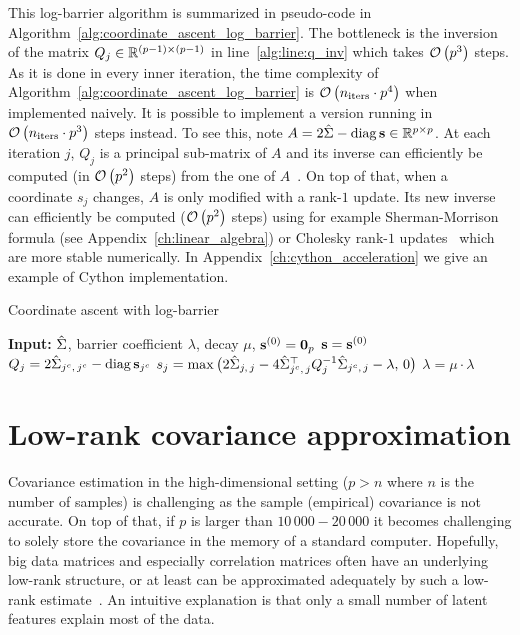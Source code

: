 \bigbreak
This log-barrier algorithm is summarized in pseudo-code in Algorithm~\ref{alg:coordinate_ascent_log_barrier}.
The bottleneck is the inversion of the matrix
$Q_j \in \mathbb{R}^{(p - 1) \times (p - 1)}$ in line~\ref{alg:line:q_inv} which takes $\mathcal{O}\left( p^3 \right)$ steps.
As it is done in every inner iteration, the time complexity of Algorithm~\ref{alg:coordinate_ascent_log_barrier} is
$\mathcal{O}\left( n_\text{iters} \cdot p^4 \right)$ when implemented naively.
It is possible to implement a version running in $\mathcal{O}\left( n_\text{iters} \cdot p^3 \right)$ steps instead.
To see this, note $A = 2\hat{\Sigma} - \operatorname*{diag}\mathbf{s} \in \mathbb{R}^{p \times p}$.
At each iteration $j$, $Q_j$ is a principal sub-matrix of $A$ and its inverse can efficiently be computed
(in $\mathcal{O}\left( p^2 \right)$ steps) from the one of $A$~\citep{submatrix_inverse}.
On top of that, when a coordinate $s_j$ changes,
$A$ is only modified with a rank-$1$ update.
Its new inverse can efficiently be computed ($\mathcal{O}\left( p^2 \right)$ steps)
using for example Sherman-Morrison formula
(see Appendix~\ref{ch:linear_algebra})
or Cholesky rank-$1$ updates~\citep{cholesky_rank_1} which are more stable numerically.
In Appendix~\ref{ch:cython_acceleration} we give an example of Cython implementation.
\begin{algorithm}[t]
    \caption{Coordinate ascent with log-barrier}\label{alg:coordinate_ascent_log_barrier}
    \begin{algorithmic}[1]
        \State \textbf{Input:} $\hat{\Sigma}$, barrier coefficient $\lambda$, decay $\mu$, $\mathbf{s}^{(0)} = \mathbf{0}_p$
        \State $\mathbf{s} = \mathbf{s}^{(0)}$
        \Repeat
        \State $Q_j = 2\hat{\Sigma}_{j^c,\, j^c} - \operatorname*{diag}\mathbf{s}_{j^c}$
        \State $s_j = \max\big( 2\hat{\Sigma}_{j,\, j} - 4\hat{\Sigma}_{j^c,\, j}^\top Q_j^{-1} \hat{\Sigma}_{j^c,\, j} - \lambda,\, 0 \big)$\label{alg:line:q_inv}
        \EndFor
        \State $\lambda = \mu \cdot \lambda$
    \end{algorithmic}
\end{algorithm}

\section{Low-rank covariance approximation}\label{sec:low_rank_sigma}

Covariance estimation in the high-dimensional setting ($p > n$ where $n$ is the number of samples)
is challenging as the sample (empirical) covariance is not accurate.
On top of that,
if $p$ is larger than $10\,000-20\,000$ it becomes challenging to solely store the covariance in the memory
of a standard computer.
Hopefully, big data matrices and especially correlation matrices often have an underlying low-rank structure,
or at least can be approximated adequately by such a low-rank estimate~\citep{big_data_low_rank}.
An intuitive explanation is that only a small number of latent features explain most of the data.

